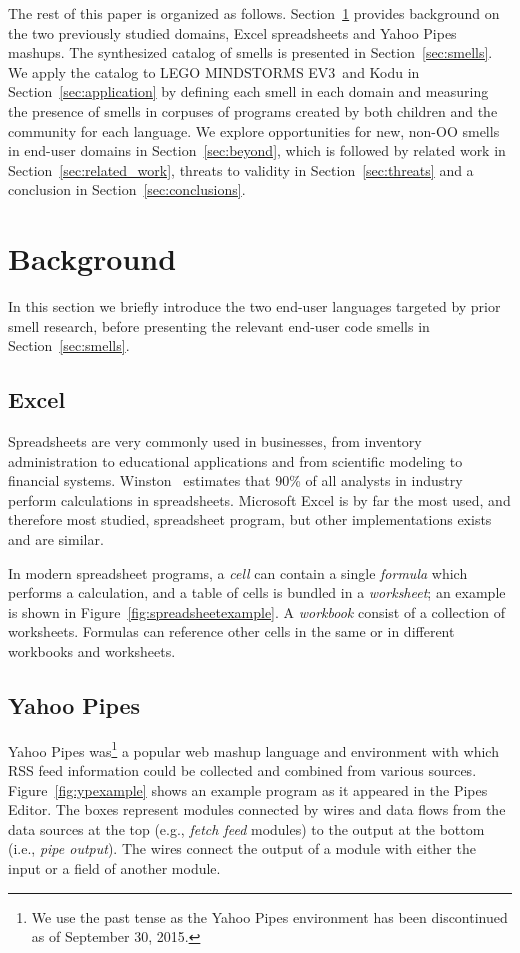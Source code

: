 \documentclass{sig-alternate}
\newcommand{\ms}{LEGO MINDSTORMS EV3}
\begin{document}
The rest of this paper is organized as follows. Section~\ref{sec:background} provides background on the two previously studied domains, Excel spreadsheets and Yahoo Pipes mashups. The synthesized catalog of smells is presented in Section~\ref{sec:smells}. We apply the catalog to \ms~and Kodu in Section~\ref{sec:application} by defining each smell in each domain and measuring the presence of smells in corpuses of programs created by both children and the community for each language. We explore opportunities for new, non-OO smells in end-user domains in Section~\ref{sec:beyond}, which is followed by related work in Section~\ref{sec:related_work}, threats to validity in Section~\ref{sec:threats} and a conclusion in Section~\ref{sec:conclusions}. 

\section{Background}
\label{sec:background}
In this section we briefly introduce the two end-user languages targeted by prior smell research, before presenting the relevant end-user code smells in Section~\ref{sec:smells}.

\subsection{Excel} Spreadsheets are very commonly used in businesses, from inventory administration to educational applications and from scientific modeling to financial systems.
Winston~\cite{Wins2001} estimates that 90\% of all analysts in industry perform calculations in spreadsheets. 
Microsoft Excel is by far the most used, and therefore most studied, spreadsheet program, but other implementations exists and are similar.

In modern spreadsheet programs, a \textit{cell} can contain a single \textit{formula} which performs a calculation, and a table of cells is bundled in a \textit{worksheet}; an example is shown in Figure~\ref{fig:spreadsheetexample}. 
A \textit{workbook} consist of a collection of worksheets.
Formulas can reference other cells in the same or in different workbooks and worksheets.



\subsection{Yahoo Pipes}
Yahoo Pipes was\footnote{We use the past tense as the Yahoo Pipes environment has been discontinued as of September 30, 2015.} a popular web mashup language and environment with which RSS feed information could be collected and combined from various sources.  Figure~\ref{fig:ypexample} shows an example program as it appeared in the Pipes Editor. The boxes represent modules connected by wires and data flows from the data sources at the top  (e.g., \emph{fetch feed} modules) to the output at the bottom (i.e., \emph{pipe output}). The wires connect the output of a module with either the input or a field of another module. 
\end{document}
